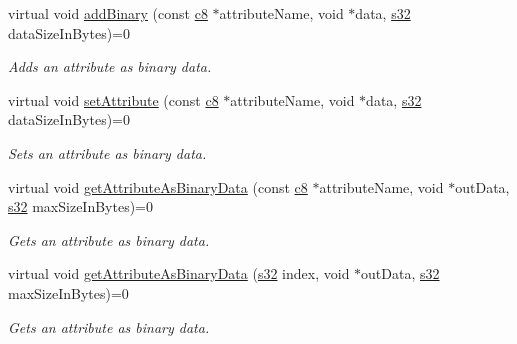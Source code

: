 \begin{DoxyCompactItemize}
\mbox{\label{classirr_1_1io_1_1IAttributes_a71b20b390b0c02324123f1cd2ea0b66f}} 
virtual void \hyperlink{classirr_1_1io_1_1IAttributes_a71b20b390b0c02324123f1cd2ea0b66f}{add\+Binary} (const \hyperlink{namespaceirr_a9395eaea339bcb546b319e9c96bf7410}{c8} $\ast$attribute\+Name, void $\ast$data, \hyperlink{namespaceirr_ac66849b7a6ed16e30ebede579f9b47c6}{s32} data\+Size\+In\+Bytes)=0
\begin{DoxyCompactList}\small\item\em Adds an attribute as binary data. \end{DoxyCompactList}\item 
\mbox{\label{classirr_1_1io_1_1IAttributes_a2901bd83d186222fc0c9d56a324e6318}} 
virtual void \hyperlink{classirr_1_1io_1_1IAttributes_a2901bd83d186222fc0c9d56a324e6318}{set\+Attribute} (const \hyperlink{namespaceirr_a9395eaea339bcb546b319e9c96bf7410}{c8} $\ast$attribute\+Name, void $\ast$data, \hyperlink{namespaceirr_ac66849b7a6ed16e30ebede579f9b47c6}{s32} data\+Size\+In\+Bytes)=0
\begin{DoxyCompactList}\small\item\em Sets an attribute as binary data. \end{DoxyCompactList}\item 
virtual void \hyperlink{classirr_1_1io_1_1IAttributes_acfb2d9c332942601f2e9757ddd8f999a}{get\+Attribute\+As\+Binary\+Data} (const \hyperlink{namespaceirr_a9395eaea339bcb546b319e9c96bf7410}{c8} $\ast$attribute\+Name, void $\ast$out\+Data, \hyperlink{namespaceirr_ac66849b7a6ed16e30ebede579f9b47c6}{s32} max\+Size\+In\+Bytes)=0
\begin{DoxyCompactList}\small\item\em Gets an attribute as binary data. \end{DoxyCompactList}\item 
virtual void \hyperlink{classirr_1_1io_1_1IAttributes_adcb3d463be127839c71838a050079b55}{get\+Attribute\+As\+Binary\+Data} (\hyperlink{namespaceirr_ac66849b7a6ed16e30ebede579f9b47c6}{s32} index, void $\ast$out\+Data, \hyperlink{namespaceirr_ac66849b7a6ed16e30ebede579f9b47c6}{s32} max\+Size\+In\+Bytes)=0
\begin{DoxyCompactList}\small\item\em Gets an attribute as binary data. \end{DoxyCompactList}\item 
\mbox{\label{classirr_1_1io_1_1IAttributes_a26d06e1f7da14ce1bfb7b84c0b22dd64}} 

\end{DoxyCompactItemize}
